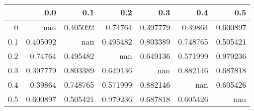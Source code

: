 \begin{tabular}{rrrrrrr}
\toprule
     &        0.0 &        0.1 &        0.2 &        0.3 &        0.4 &        0.5 \\
\midrule
 0   & nan        &   0.405092 &   0.74764  &   0.397779 &   0.39864  &   0.600897 \\
 0.1 &   0.405092 & nan        &   0.495482 &   0.803389 &   0.748765 &   0.505421 \\
 0.2 &   0.74764  &   0.495482 & nan        &   0.649136 &   0.571999 &   0.979236 \\
 0.3 &   0.397779 &   0.803389 &   0.649136 & nan        &   0.882146 &   0.687818 \\
 0.4 &   0.39864  &   0.748765 &   0.571999 &   0.882146 & nan        &   0.605426 \\
 0.5 &   0.600897 &   0.505421 &   0.979236 &   0.687818 &   0.605426 & nan        \\
\bottomrule
\end{tabular}